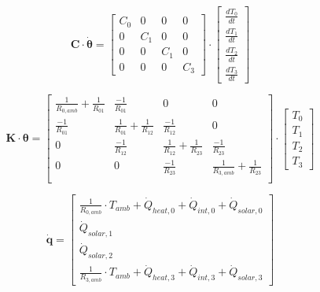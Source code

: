 \begin{equation}
	\mathbf{C} \cdot \boldsymbol{\dot{\theta}} =
	\begin{bmatrix}
		C_{0} & 0 & 0 & 0\\
		0 &  C_{1} & 0 & 0 \\
		0 & 0 & C_{1} & 0\\
		0 & 0 & 0 & C_{3}
	\end{bmatrix}
	\cdot
	\begin{bmatrix}
		\frac{dT_{0}}{dt} \\
		\frac{dT_{1}}{dt} \\
	    \frac{dT_{2}}{dt} \\
	    \frac{dT_{3}}{dt} 
	\end{bmatrix}
\end{equation}

\begin{equation}
	\mathbf{K} \cdot \boldsymbol{\theta} =
	\begin{bmatrix}
		\frac{1}{R_{0, amb}} + \frac{1}{R_{01}} & \frac{-1}{R_{01}} & 0 & 0 \\
		\frac{-1}{R_{01}} &  \frac{1}{R_{01}} + \frac{1}{R_{12}} & \frac{-1}{R_{12}} & 0 \\
		 0 & \frac{-1}{R_{12}} & \frac{1}{R_{12}} + \frac{1}{R_{23}}  & \frac{-1}{R_{23}}\\
	 	 0 & 0 & \frac{-1}{R_{23}} &  \frac{1}{R_{3, amb}} + \frac{1}{R_{23}} \\
	\end{bmatrix}
	\cdot
	\begin{bmatrix}
		T_{0} \\
		T_{1} \\
		T_{2} \\
		T_{3}
	\end{bmatrix}
\end{equation}

\begin{equation}
	\mathbf{\dot{q}} =
	\begin{bmatrix}
		\frac{1}{R_{0, amb}} \cdot T_{amb} + \dot{Q}_{heat, 0} + \dot{Q}_{int, 0} + \dot{Q}_{solar, 0} \\
		\dot{Q}_{solar, 1} \\
		\dot{Q}_{solar, 2} \\
		\frac{1}{R_{3, amb}} \cdot T_{amb} + \dot{Q}_{heat, 3} + \dot{Q}_{int, 3} + \dot{Q}_{solar, 3}
	\end{bmatrix}
\end{equation}

